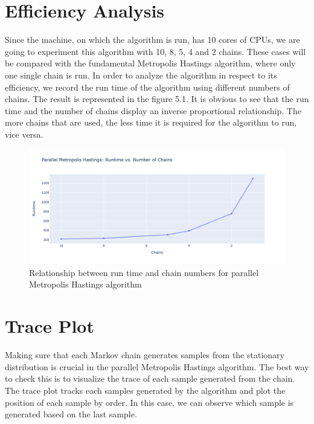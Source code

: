 \section{Efficiency Analysis}
Since the machine, on which the algorithm is run, has 10 cores of CPUs, we are going to experiment this algorithm with 10, 8, 5, 4 and 2 chains. These cases will be compared with the fundamental Metropolis Hastings algorithm, where only one single chain is run. In order to analyze the algorithm in respect to its efficiency, we record the run time of the algorithm using different numbers of chains. The result is represented in the figure 5.1. It is obvious to see that the run time and the number of chains display an inverse proportional relationship. The more chains that are used, the less time it is required for the algorithm to run, vice versa.

\begin{figure}[H]
    \centering
    \includegraphics[width=1\textwidth]{figures/parallel_mh/runtime.png}
    \captionsetup{width=.8\textwidth}
    \caption{Relationship between run time and chain numbers for parallel Metropolis Hastings algorithm}
    \label{fig:enter-label}
\end{figure}

\section{Trace Plot}
Making sure that each Markov chain generates samples from the stationary distribution is crucial in the parallel Metropolis Hastings algorithm. The best way to check this is to visualize the trace of each sample generated from the chain.\cite{mcmc_practice} The trace plot tracks each samples generated by the algorithm and plot the position of each sample by order. In this case, we can observe which sample is generated based on the last sample.

